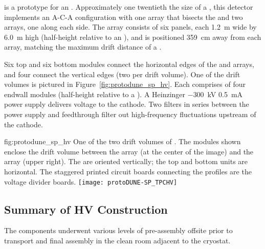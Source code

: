  \cite{Abi:2017aow} is a prototype for an . %
Approximately one twentieth the size of a , this detector implements an A-C-A configuration with one  array that bisects the  and two  arrays, one along each side. 
The  array consists of %
six  panels, each \SI{1.2}{m} wide by \SI{6.0}{m} high (half-height relative to an ), 
and is positioned \SI{359}{cm} away from each  array, matching the maximum drift distance of a .

Six top and six bottom  modules connect the horizontal edges of the  and  arrays, and four %
 connect the vertical edges (two per drift volume). One of the drift volumes is pictured in Figure~\ref{fig:protodune_sp_hv}. 
Each  comprises of four endwall modules (half-height relative to a ).
A Heinzinger $-$\SI{300}{kV} \SI{0.5}{mA}  power supply delivers voltage to the cathode.
Two  filters in series between the power supply and  feedthrough filter out high-frequency fluctuations upstream of the cathode.

\begin{dunefigure}
{fig:protodune_sp_hv}
{One of the two drift volumes of . The  modules shown enclose the drift volume between the  array (at the center of the image) and the  array (upper right). The  are oriented vertically; the top and bottom units are horizontal. The staggered printed circuit boards connecting the  profiles are the voltage divider boards. %
}
\texttt{[image: protoDUNE-SP\_TPCHV]}
\end{dunefigure}

\subsection{Summary of HV Construction}
\label{sec:fdsp-hv-protodune-summary}

The   components underwent %
various levels of pre-assembly offsite prior to transport and final assembly in the  clean room adjacent to the cryostat.

